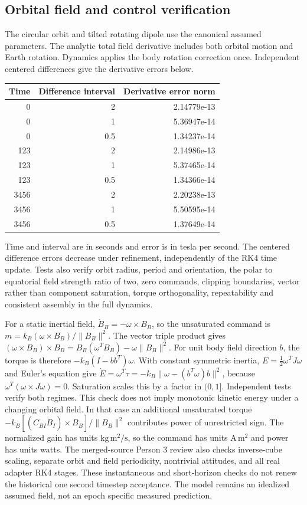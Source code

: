 \subsection{Orbital field and control verification}
The circular orbit and tilted rotating dipole use the canonical assumed
parameters. The analytic total field derivative includes both orbital motion
and Earth rotation. Dynamics applies the body rotation correction once.
Independent centered differences give the derivative errors below.
\begin{center}
\begin{tabular}{rrr}
Time & Difference interval & Derivative error norm \\
\hline
0 & 2 & 2.14779e-13 \\
0 & 1 & 5.36947e-14 \\
0 & 0.5 & 1.34237e-14 \\
123 & 2 & 2.14986e-13 \\
123 & 1 & 5.37465e-14 \\
123 & 0.5 & 1.34366e-14 \\
3456 & 2 & 2.20238e-13 \\
3456 & 1 & 5.50595e-14 \\
3456 & 0.5 & 1.37649e-14 \\
\end{tabular}
\end{center}
Time and interval are in seconds and error is in tesla per second. The
centered difference errors decrease under refinement, independently of the
RK4 time update. Tests also verify orbit radius, period and orientation,
the polar to equatorial field strength ratio of two, zero commands, clipping
boundaries, vector rather than component saturation, torque orthogonality,
repeatability and consistent assembly in the full dynamics.

For a static inertial field, $\dot B_B=-\omega\times B_B$, so the
unsaturated command is $m=k_B(\omega\times B_B)/\|B_B\|^2$.
The vector triple product gives
$(\omega\times B_B)\times B_B=B_B(\omega^TB_B)-\omega\|B_B\|^2$.
For unit body field direction $b$, the torque is therefore
$-k_B(I-bb^T)\omega$. With constant symmetric inertia,
$E=\tfrac12\omega^TJ\omega$ and Euler's equation give
$\dot E=\omega^T\tau=-k_B\|\omega-(b^T\omega)b\|^2$,
because $\omega^T(\omega\times J\omega)=0$.
Saturation scales this by a factor in
$(0,1]$. Independent tests verify both regimes. This check does not imply
monotonic kinetic energy under a changing orbital field. In that case an
additional unsaturated torque
$-k_B[(C_{BI}\dot B_I)\times B_B]/\|B_B\|^2$ contributes power of
unrestricted sign. The normalized gain has units $\mathrm{kg\,m^2/s}$,
so the command has units $\mathrm{A\,m^2}$ and power has units watts.
The merged-source Person 3 review also checks inverse-cube scaling,
separate orbit and field periodicity, nontrivial attitudes, and all real
adapter RK4 stages. These instantaneous and short-horizon checks do not
renew the historical one second timestep acceptance. The model remains
an idealized assumed field, not an epoch specific measured prediction.
